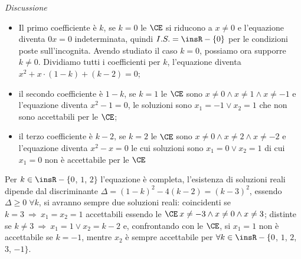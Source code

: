 \begin{exrig}
\begin{esempio}
\emph{Discussione}
\begin{itemize}
 \item Il primo coefficiente è $k$, se $k = 0$ le $\CE$ si riducono a $x \neq 0$ e l'equazione diventa $0x = 0$ indeterminata, quindi $I.S. = \insR - \{ 0\}$ per le condizioni poste sull'incognita. Avendo studiato il caso $k=0$, possiamo ora supporre $k \neq 0$. Dividiamo tutti i coefficienti per $k$, l'equazione diventa $x^{2} + x \cdot ( 1 - k ) + ( k - 2 )=0$;
 \item il secondo coefficiente è $1-k$, se $k = 1$ le $\CE$ sono $x \neq 0 \wedge x \neq 1 \wedge x \neq - 1$ e l'equazione diventa $x^{2} - 1 = 0$, le soluzioni sono $x_{1} = -1 \vee x_{2} = 1$ che non sono accettabili per le $\CE$;
 \item il terzo coefficiente è $k-2$, se $k = 2$ le $\CE$ sono $x \neq 0 \wedge x \neq 2 \wedge x \neq - 2$ e l'equazione diventa $x^{2} - x = 0$ le cui soluzioni sono $x_{1} = 0 \vee x_{2} = 1$ di cui $x_{1} = 0$ non è accettabile per le $\CE$
\end{itemize}
Per $k \in \insR - \{0$, $1$, $2\}$ l'equazione è completa, l'esistenza di soluzioni reali dipende dal discriminante $\Delta = (1 - k)^{2}-4(k-2)=(k-3)^{2}$, essendo
$\Delta \geq 0\; \forall k$, si avranno sempre due soluzioni reali: coincidenti se $k = 3 \:\Rightarrow\: x_{1} = x_{2} = 1$ accettabili essendo le
$\CE\: x \neq - 3 \wedge x \neq 0 \wedge x \neq 3$; distinte se $k \neq 3 \:\Rightarrow\: x_{1} = 1 \vee x_{2} = k - 2$ e, confrontando con le $\CE$, si $x_{1} = 1$
non è accettabile se $k = - 1$, mentre $x_{2}$ è sempre accettabile per $\forall k \in \insR - \{0$, $1$, $2$, $3$, $-1\}$.


\end{esempio}
\end{exrig}
